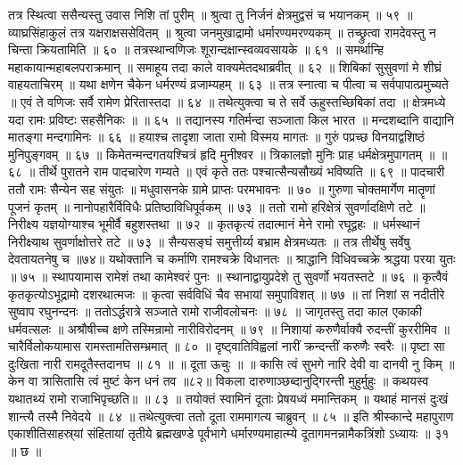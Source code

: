तत्र स्थित्वा ससैन्यस्तु उवास निशि तां पुरीम् ॥
श्रुत्वा तु निर्जनं क्षेत्रमुद्वसं च भयानकम् ॥ ५९ ॥
व्याघ्रसिंहाकुलं तत्र यक्षराक्षससेवितम् ॥
श्रुत्वा जनमुखाद्रामो धर्मारण्यमरण्यकम् ॥
तच्छ्रुत्वा रामदेवस्तु न चिन्ता क्रियतामिति ॥ ६० ॥
तत्रस्थान्वणिजः शूरान्दक्षान्स्वव्यवसायके ॥ ६१ ॥
समर्थान्हि महाकायान्महाबलपराक्रमान् ॥
समाहूय तदा काले वाक्यमेतदथाब्रवीत् ॥ ६२ ॥
शिबिकां सुसुवणां मे शीघ्रं वाहयताचिरम् ॥
यथा क्षणेन चैकेन धर्मरण्यं व्रजाम्यहम् ॥ ६३ ॥
तत्र स्नात्वा च पीत्वा च सर्वपापात्प्रमुच्यते ॥
एवं ते वणिजः सर्वै रामेण प्रेरितास्तदा ॥ ६४ ॥
तथेत्युक्त्वा च ते सर्वे ऊहुस्तच्छिबिकां तदा ॥
क्षेत्रमध्ये यदा रामः प्रविष्टः सहसैनिकः ॥ ॥ ६५ ॥
तद्यानस्य गतिर्मन्दा सञ्जाता किल भारत ॥
मन्दशब्दानि वाद्यानि मातङ्गा मन्दगामिनः ॥ ६६ ॥
हयाश्च तादृशा जाता रामो विस्मय मागतः ॥
गुरुं पप्रच्छ विनयाद्वशिष्ठं मुनिपुङ्गवम् ॥ ६७ ॥
किमेतन्मन्दगतयश्चित्रं हृदि मुनीश्वर ॥
त्रिकालज्ञो मुनिः प्राह धर्मक्षेत्रमुपागतम् ॥ ॥ ६८ ॥
तीर्थे पुरातने राम पादचारेण गम्यते ॥
एवं कृते ततः पश्चात्सैन्यसौख्यं भविष्यति ॥ ६९ ॥
पादचारी ततौ रामः सैन्येन सह संयुतः ॥
मधुवासनके ग्रामे प्राप्तः परमभावनः ॥ ७० ॥
गुरुणा चोक्तमार्गेण मातॄणां पूजनं कृतम् ॥
नानोपहारैर्विविधैः प्रतिष्ठाविधिपूर्वकम् ॥ ७३ ॥
ततो रामो हरिक्षेत्रं सुवर्णादक्षिणे तटे ॥
निरीक्ष्य यज्ञयोग्याश्च भूमीर्वै बहुशस्तथा ॥ ७२ ॥
कृतकृत्यं तदात्मानं मेने रामो रघूद्वहः ॥
धर्मस्थानं निरीक्ष्याथ सुवर्णाक्षोत्तरे तटे ॥ ७३ ॥
सैन्यसङ्घं समुत्तीर्य्य बभ्राम क्षेत्रमध्यतः ॥
तत्र तीर्थेषु सर्वेषु देवतायतनेषु च ॥७४॥
यथोक्तानि च कर्माणि रामश्चक्रे विधानतः ॥
श्राद्धानि विधिवच्चक्रे श्रद्धया परया युतः ॥ ७५ ॥
स्थापयामास रामेशं तथा कामेश्वरं पुनः ॥
स्थानाद्वायुप्रदेशे तु सुवर्णो भयतस्तटे ॥ ७६ ॥
कृत्वैवं कृतकृत्योऽभूद्रामो दशरथात्मजः ॥
कृत्वा सर्वविधिं चैव सभायां समुपाविशत् ॥ ७७ ॥
तां निशां स नदीतीरे सुष्वाप रघुनन्दनः ॥
ततोऽर्द्धरात्रे सञ्जाते रामो राजीवलोचनः ॥ ७८ ॥
जागृतस्तु तदा काल एकाकी धर्मवत्सलः ॥
अश्रौषीच्च क्षणे तस्मिन्रामो नारीविरोदनम् ॥ ७९ ॥
निशायां करुणैर्वाक्यै रुदन्तीं कुररीमिव ॥
चारैर्विलोकयामास रामस्तामतिसम्भ्रमात् ॥ ८० ॥
दृष्ट्वातिविह्वलां नारीं क्रन्दन्तीं करुणैः स्वरैः ॥
पृष्टा सा दुःखिता नारी रामदूतैस्तदानघ ॥ ८१ ॥
॥ दूता ऊचुः ॥ ॥
कासि त्वं सुभगे नारि देवी वा दानवी नु किम् ॥
केन वा त्रासितासि त्वं मुष्टं केन धनं तव ॥८२॥
विकला दारुणाञ्छब्दानुद्गिरन्ती मुहुर्मुहुः ॥
कथयस्व यथातथ्यं रामो राजाभिपृच्छति॥ ॥ ८३ ॥
तयोक्तं स्वामिनं दूताः प्रेषयध्वं ममान्तिकम् ॥
यथाहं मानसं दुःखं शान्त्यै तस्मै निवेदये ॥ ८४ ॥
तथेत्युक्त्वा ततो दूता राममागत्य चाब्रुवन् ॥ ८५ ॥
इति श्रीस्कान्दे महापुराण एकाशीतिसाहस्र्यां संहितायां तृतीये ब्रह्मखण्डे पूर्वभागे धर्मारण्यमाहात्म्ये दूतागमनन्नामैकत्रिंशो ऽध्यायः ॥ ३१ ॥ छ ॥

